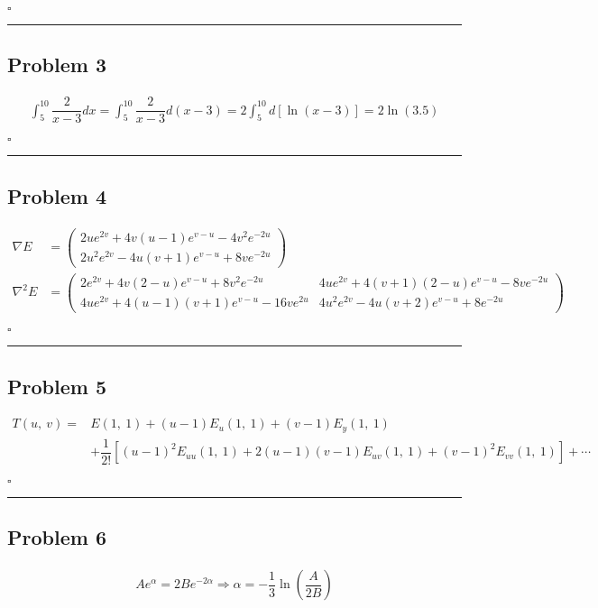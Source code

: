 \documentclass[12pt]{article}
\newcommand*{\QEDB}{\hfill\ensuremath{\square}}
\newcommand{\SBrackets}[1]{\left[#1\right]}
\newcommand{\ParTh}[1]{\left(#1\right)}
\newcommand{\Matrix}[2]{\ParTh{\begin{array}{#1}#2\end{array}}}
\newcommand{\horrule}[1]{\rule{\linewidth}{#1}}
\begin{document}
\QEDB

\horrule{0.5pt}

\subsection*{Problem 3}

\begin{align}
\int_{5}^{10}\dfrac{2}{x-3}dx=\int_{5}^{10}\dfrac{2}{x-3}d\ParTh{x-3}=2\int_{5}^{10}d\SBrackets{\ln\ParTh{x-3}}=2\ln\ParTh{3.5}
\end{align}

\QEDB

\horrule{0.5pt}

\subsection*{Problem 4}

\begin{align}
\nabla E&=\Matrix{c}{2ue^{2v}+4v\ParTh{u-1}e^{v-u}-4v^2e^{-2u}\\2u^2e^{2v}-4u\ParTh{v+1}e^{v-u}+8ve^{-2u}}\\
\nabla^2 E&=\Matrix{cc}{2e^{2v}+4v\ParTh{2-u}e^{v-u}+8v^2e^{-2u}&4ue^{2v}+4\ParTh{v+1}\ParTh{2-u}e^{v-u}-8ve^{-2u}\\4ue^{2v}+4\ParTh{u-1}\ParTh{v+1}e^{v-u}-16ve^{2u}&4u^2e^{2v}-4u\ParTh{v+2}e^{v-u}+8e^{-2u}}
\end{align}

\QEDB

\horrule{0.5pt}

\subsection*{Problem 5}

\begin{align}
T\ParTh{u,~v}=&E\ParTh{1,~1}+\ParTh{u-1}E_u\ParTh{1,~1}+\ParTh{v-1}E_y\ParTh{1,~1}\\
\nonumber
&+\dfrac{1}{2!}\SBrackets{\ParTh{u-1}^2E_{uu}\ParTh{1,~1}+2\ParTh{u-1}\ParTh{v-1}E_{uv}\ParTh{1,~1}+\ParTh{v-1}^2E_{vv}\ParTh{1,~1}}+\cdots
\end{align}

\QEDB

\horrule{0.5pt}

\subsection*{Problem 6}

\begin{align}
Ae^{\alpha}=2Be^{-2\alpha}\Rightarrow\alpha=-\dfrac{1}{3}\ln\ParTh{\dfrac{A}{2B}}
\end{align}
\end{document}
